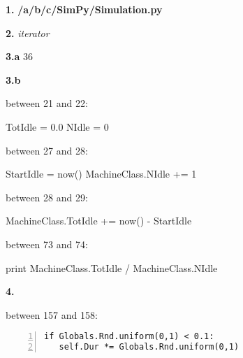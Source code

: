 \documentclass[twocolumn]{article}
\begin{document}
{\bf 1.} {\bf /a/b/c/SimPy/Simulation.py}

{\bf 2.} {\it iterator}

{\bf 3.a} 36

{\bf 3.b} 

between 21 and 22:

TotIdle = 0.0
NIdle = 0

between 27 and 28:

StartIdle = now()
MachineClass.NIdle += 1

between 28 and 29:

MachineClass.TotIdle += now() - StartIdle

between 73 and 74:

print MachineClass.TotIdle / MachineClass.NIdle

{\bf 4.}

between 157 and 158:

\begin{lstlisting}[numbers=left]
if Globals.Rnd.uniform(0,1) < 0.1:
   self.Dur *= Globals.Rnd.uniform(0,1)
\end{lstlisting}
\end{document}
